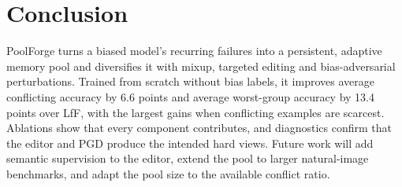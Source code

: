 \documentclass[10pt,twocolumn,letterpaper]{article}
\begin{document}
\section{Conclusion}
PoolForge turns a biased model's recurring failures into a persistent, adaptive memory pool and diversifies it with mixup, targeted editing and bias-adversarial perturbations. Trained from scratch without bias labels, it improves average conflicting accuracy by 6.6 points and average worst-group accuracy by 13.4 points over LfF, with the largest gains when conflicting examples are scarcest. Ablations show that every component contributes, and diagnostics confirm that the editor and PGD produce the intended hard views. Future work will add semantic supervision to the editor, extend the pool to larger natural-image benchmarks, and adapt the pool size to the available conflict ratio.

{\small


}
\end{document}
